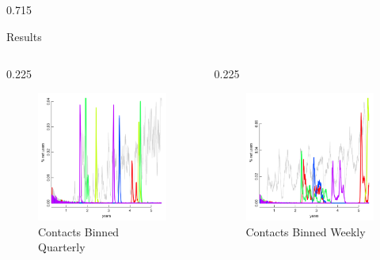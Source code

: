 \documentclass[final]{beamer} %
\newcommand{\spaceProp}{0.02}
\newcommand{\spacer}{\begin{column}{\spaceProp\paperwidth}\end{column}}
\newenvironment{oneCol}{\begin{column}[t]{0.225\paperwidth}}{\end{column}}
\newenvironment{threeCol}{\begin{column}[t]{0.715\paperwidth}}{\end{column}}
\begin{document}
\begin{frame}{}
\begin{columns}[t]
\begin{threeCol}
\begin{block}{Results}
\begin{columns}
\begin{oneCol}
\begin{figure}
        \includegraphics[width=1.0\linewidth]{out90.png}
        \caption{Contacts Binned Quarterly}
      \end{figure}  
    \end{oneCol}
    \begin{oneCol}
      \begin{figure}
        \caption{Contacts Binned Weekly}
        \includegraphics[width=1.0\linewidth]{out7.png}

\end{figure}
\end{oneCol}
\end{columns}
\end{block}
\end{threeCol}
\end{columns}
\end{frame}
\end{document}
